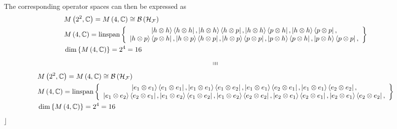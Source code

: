 \documentclass[aps,preprint]{revtex4}%
\begin{document}
The corresponding operator spaces can then be expressed as
\begin{align}
&  M\left(  2^{2},\mathbb{C}\right)  =M\left(  4,\mathbb{C}\right)
\cong\mathcal{B}\left(  \mathcal{H}_{\mathcal{F}}\right) \\
&  M\left(  4,\mathbb{C}\right)  =\operatorname*{linspan}\left\{
\begin{array}
[c]{c}%
\left\vert h\otimes h\right\rangle \left\langle h\otimes h\right\vert
,\left\vert h\otimes h\right\rangle \left\langle h\otimes p\right\vert
,\left\vert h\otimes h\right\rangle \left\langle p\otimes h\right\vert
,\left\vert h\otimes h\right\rangle \left\langle p\otimes p\right\vert ,\\
\left\vert h\otimes p\right\rangle \left\langle p\otimes h\right\vert
,\left\vert h\otimes p\right\rangle \left\langle h\otimes p\right\vert
,\left\vert h\otimes p\right\rangle \left\langle p\otimes p\right\vert
,\left\vert p\otimes h\right\rangle \left\langle p\otimes h\right\vert
,\left\vert p\otimes h\right\rangle \left\langle p\otimes p\right\vert ,
\end{array}
\right\} \\
&  \dim\left\{  M\left(  4,\mathbb{C}\right)  \right\}  =2^{4}=16
\end{align}%
\begin{equation}
\shortparallel\shortparallel
\end{equation}%
\begin{align}
&  M\left(  2^{2},\mathbb{C}\right)  =M\left(  4,\mathbb{C}\right)
\cong\mathcal{B}\left(  \mathcal{H}_{\mathcal{F}}\right) \\
&  M\left(  4,\mathbb{C}\right)  =\operatorname*{linspan}\left\{
\begin{array}
[c]{c}%
\left\vert e_{1}\otimes e_{1}\right\rangle \left\langle e_{1}\otimes
e_{1}\right\vert ,\left\vert e_{1}\otimes e_{1}\right\rangle \left\langle
e_{1}\otimes e_{2}\right\vert ,\left\vert e_{1}\otimes e_{1}\right\rangle
\left\langle e_{2}\otimes e_{1}\right\vert ,\left\vert e_{1}\otimes
e_{1}\right\rangle \left\langle e_{2}\otimes e_{2}\right\vert ,\\
\left\vert e_{1}\otimes e_{2}\right\rangle \left\langle e_{2}\otimes
e_{1}\right\vert ,\left\vert e_{1}\otimes e_{2}\right\rangle \left\langle
e_{1}\otimes e_{2}\right\vert ,\left\vert e_{1}\otimes e_{2}\right\rangle
\left\langle e_{2}\otimes e_{2}\right\vert ,\left\vert e_{2}\otimes
e_{1}\right\rangle \left\langle e_{2}\otimes e_{1}\right\vert ,\left\vert
e_{2}\otimes e_{1}\right\rangle \left\langle e_{2}\otimes e_{2}\right\vert ,
\end{array}
\right\} \\
&  \dim\left\{  M\left(  4,\mathbb{C}\right)  \right\}  =2^{4}=16
\end{align}
$\rfloor$
\end{document}
